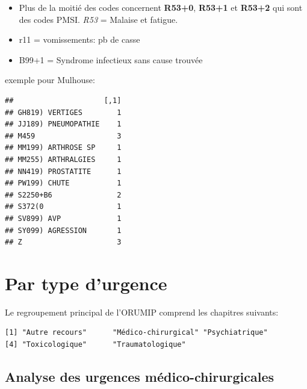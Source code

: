\documentclass[]{article}
\newenvironment{Shaded}{\begin{snugshade}}{\end{snugshade}}
\newcommand{\KeywordTok}[1]{\textcolor[rgb]{0.13,0.29,0.53}{\textbf{{#1}}}}
\newcommand{\StringTok}[1]{\textcolor[rgb]{0.31,0.60,0.02}{{#1}}}
\newcommand{\NormalTok}[1]{{#1}}
\begin{document}
\begin{itemize}
\itemsep1pt\parskip0pt
\item
  Plus de la moitié des codes concernent \textbf{R53+0}, \textbf{R53+1}
  et \textbf{R53+2} qui sont des codes PMSI. \emph{R53} = Malaise et
  fatigue.
\item
  r11 = vomissements: pb de casse
\item
  B99+1 = Syndrome infectieux sans cause trouvée
\end{itemize}

exemple pour Mulhouse:

\begin{Shaded}
\end{Shaded}

\begin{verbatim}
##                     [,1]
## GH819) VERTIGES        1
## JJ189) PNEUMOPATHIE    1
## M459                   3
## MM199) ARTHROSE SP     1
## MM255) ARTHRALGIES     1
## NN419) PROSTATITE      1
## PW199) CHUTE           1
## S2250+B6               2
## S372(0                 1
## SV899) AVP             1
## SY099) AGRESSION       1
## Z                      3
\end{verbatim}

\section{Par type d'urgence}\label{par-type-durgence}

Le regroupement principal de l'ORUMIP comprend les chapitres suivants:

\begin{verbatim}
[1] "Autre recours"      "Médico-chirurgical" "Psychiatrique"     
[4] "Toxicologique"      "Traumatologique"   
\end{verbatim}

\subsection{Analyse des urgences
médico-chirurgicales}\label{analyse-des-urgences-medico-chirurgicales}
\end{document}

